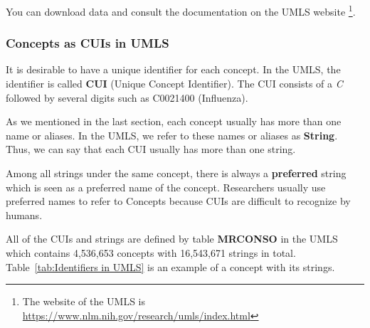 You can download data and consult the documentation on the UMLS website \footnote{The website of the UMLS is  \url{https://www.nlm.nih.gov/research/umls/index.html}}. 

\subsubsection{Concepts as CUIs in UMLS}
It is desirable to have a unique identifier for each concept. In the UMLS, the identifier is called \textbf{CUI} (Unique Concept Identifier). The CUI consists of a \emph{C} followed by several digits such as C0021400 (Influenza). 

As we mentioned in the last section, each concept usually has more than one name or aliases. In the UMLS, we refer to these names or aliases as \textbf{String}. Thus, we can say that each CUI usually has more than one string. 

Among all strings under the same concept, there is always a \textbf{preferred} string which is seen as a preferred name of the concept. Researchers usually use preferred names to refer to Concepts because CUIs are difficult to recognize by humans. 

All of the CUIs and strings are defined by table \textbf{MRCONSO} in the UMLS which contains 4,536,653 concepts with 16,543,671 strings in total. Table~\ref{tab:Identifiers in UMLS} is an example of a concept with its strings.

